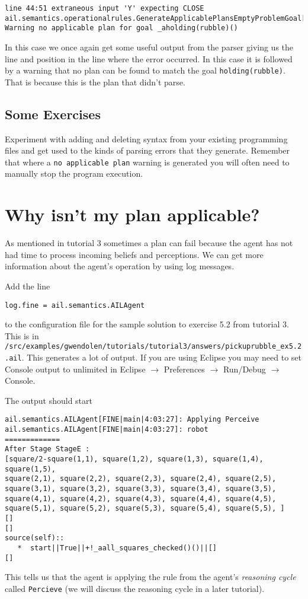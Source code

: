 \documentclass[a4]{article}
\begin{document}
\begin{verbatim}
line 44:51 extraneous input 'Y' expecting CLOSE
ail.semantics.operationalrules.GenerateApplicablePlansEmptyProblemGoal[WARNING|main|3:19:44]: 
Warning no applicable plan for goal _aholding(rubble)() 
\end{verbatim}

In this case we once again get some useful output from the parser giving us the line and position in the line where the error occurred.  In this case it is followed by a warning that no plan can be found to match the goal \texttt{holding(rubble)}.  That is because this is the plan that didn't parse.

\subsection{Some Exercises}
Experiment with adding and deleting syntax from your existing programming files and get used to the kinds of parsing errors that they generate.  Remember that where a \texttt{no applicable plan} warning is generated you will often need to manually stop the program execution.

\section{Why isn't my plan applicable?}

As mentioned in tutorial 3 sometimes a plan can fail because the agent has not had time to process incoming beliefs and perceptions.  We can get more information about the agent's operation by using log messages.

Add the line
\begin{verbatim}
log.fine = ail.semantics.AILAgent
\end{verbatim}
to the configuration file for the sample solution to exercise 5.2 from tutorial 3.  This is in \texttt{/src/examples/gwendolen/tutorials/tutorial3/answers/pickuprubble\_ex5.2.ail}.  This generates a lot of output.  If you are using Eclipse you may need to set Console output to unlimited in Eclipse $\rightarrow$ Preferences $\rightarrow$ Run/Debug $\rightarrow$ Console.

The output should start
\begin{verbatim}
ail.semantics.AILAgent[FINE|main|4:03:27]: Applying Perceive 
ail.semantics.AILAgent[FINE|main|4:03:27]: robot
=============
After Stage StageE :
[square/2-square(1,1), square(1,2), square(1,3), square(1,4), square(1,5), 
square(2,1), square(2,2), square(2,3), square(2,4), square(2,5), 
square(3,1), square(3,2), square(3,3), square(3,4), square(3,5), 
square(4,1), square(4,2), square(4,3), square(4,4), square(4,5), 
square(5,1), square(5,2), square(5,3), square(5,4), square(5,5), ]
[]
[]
source(self):: 
   *  start||True||+!_aall_squares_checked()()||[]
[] 
\end{verbatim}
This tells us that the agent is applying the rule from the agent's \emph{reasoning cycle} called \texttt{Percieve} (we will discuss the reasoning cycle in a later tutorial).
\end{document}
